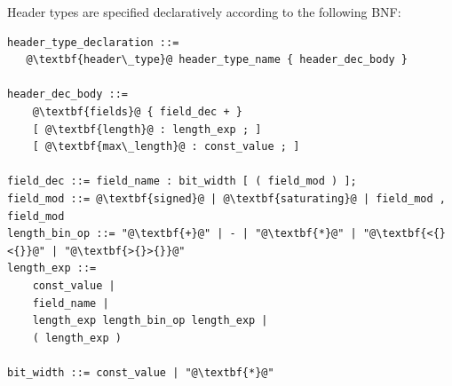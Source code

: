 \documentclass[12pt]{article}
\begin{document}
Header types are specified declaratively according to the following BNF:

\begin{lstlisting}[frame=single,backgroundcolor=\color{bnfgreen},escapechar=\@]
header_type_declaration ::= 
   @\textbf{header\_type}@ header_type_name { header_dec_body }

header_dec_body ::=
    @\textbf{fields}@ { field_dec + }
    [ @\textbf{length}@ : length_exp ; ]
    [ @\textbf{max\_length}@ : const_value ; ]

field_dec ::= field_name : bit_width [ ( field_mod ) ];
field_mod ::= @\textbf{signed}@ | @\textbf{saturating}@ | field_mod , field_mod
length_bin_op ::= "@\textbf{+}@" | - | "@\textbf{*}@" | "@\textbf{<{}<{}}@" | "@\textbf{>{}>{}}@"
length_exp ::=
    const_value |
    field_name |
    length_exp length_bin_op length_exp |
    ( length_exp )

bit_width ::= const_value | "@\textbf{*}@"
\end{lstlisting}
\end{document}
